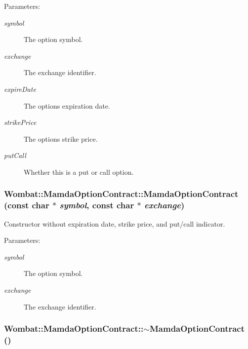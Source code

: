\begin{Desc}
\item[Parameters:]
\begin{description}
\item[{\em symbol}]The option symbol. \item[{\em exchange}]The exchange identifier. \item[{\em expire\-Date}]The options expiration date. \item[{\em strike\-Price}]The options strike price. \item[{\em put\-Call}]Whether this is a put or call option. \end{description}
\end{Desc}
\hypertarget{classWombat_1_1MamdaOptionContract_ad227199b28a941463a0f25aeae70117}{
\subsubsection[MamdaOptionContract]{\setlength{\rightskip}{0pt plus 5cm}Wombat::Mamda\-Option\-Contract::Mamda\-Option\-Contract (const char $\ast$ {\em symbol}, const char $\ast$ {\em exchange})}}
\label{classWombat_1_1MamdaOptionContract_ad227199b28a941463a0f25aeae70117}


Constructor without expiration date, strike price, and put/call indicator. 

\begin{Desc}
\item[Parameters:]
\begin{description}
\item[{\em symbol}]The option symbol. \item[{\em exchange}]The exchange identifier. \end{description}
\end{Desc}
\hypertarget{classWombat_1_1MamdaOptionContract_e65375537ef11b3425443ded04c35613}{
\subsubsection[$\sim$MamdaOptionContract]{\setlength{\rightskip}{0pt plus 5cm}Wombat::Mamda\-Option\-Contract::$\sim$Mamda\-Option\-Contract ()}}
\label{classWombat_1_1MamdaOptionContract_e65375537ef11b3425443ded04c35613}


